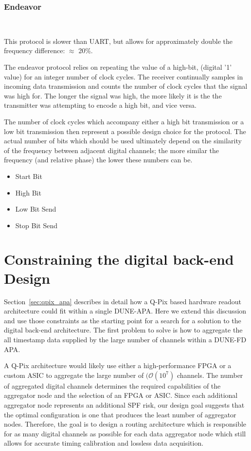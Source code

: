 \subsubsection{Endeavor}~\label{sec:endeavor}

This protocol is slower than UART, but allows for approximately double the frequency difference: $\approx$ 20\%.

The endeavor protocol relies on repeating the value of a high-bit, (digital '1' value) for an integer number of clock cycles.
The receiver continually samples in incoming data transmission and counts the number of clock cycles that the signal was high for.
The longer the signal was high, the more likely it is the the transmitter was attempting to encode a high bit, and vice versa.

The number of clock cycles which accompany either a high bit transmission or a low bit transmission then represent a possible design choice for the protocol.
The actual number of bits which should be used ultimately depend on the similarity of the frequency between adjacent digital channels; the more similar the frequency (and relative phase) the lower these numbers can be.

\begin{itemize}
    \item Start Bit
    \item High Bit
    \item Low Bit Send
    \item Stop Bit Send
\end{itemize}\label{item:endeavor}

\section{Constraining the digital back-end Design}

Section~\ref{sec:qpix_apa} describes in detail how a Q-Pix based hardware readout architecture could fit within a single DUNE-APA.
Here we extend this discussion and use those constraints as the starting point for a search for a solution to the digital back-end architecture.
The first problem to solve is how to aggregate the all timestamp data supplied by the large number of channels within a DUNE-FD APA.

A Q-Pix architecture would likely use either a high-performance FPGA or a custom ASIC to aggregate the large number of $(\mathcal{O}(10^{7})$ channels.
The number of aggregated digital channels determines the required capabilities of the aggregator node and the selection of an FPGA or ASIC.
Since each additional aggregator node represents an additional SPF risk, our design goal suggests that the optimal configuration is one that produces the least number of aggregator nodes.
Therefore, the goal is to design a routing architecture which is responsible for as many digital channels as possible for each data aggregator node which still allows for accurate timing calibration and lossless data acquisition.

